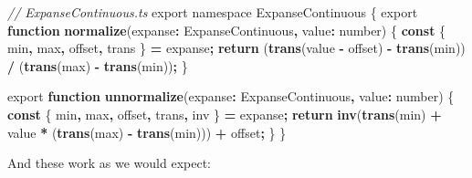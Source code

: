 \documentclass[
]{book}
\newenvironment{Shaded}{\begin{snugshade}}{\end{snugshade}}
\newcommand{\CommentTok}[1]{\textcolor[rgb]{0.56,0.35,0.01}{\textit{#1}}}
\newcommand{\ControlFlowTok}[1]{\textcolor[rgb]{0.13,0.29,0.53}{\textbf{#1}}}
\newcommand{\DataTypeTok}[1]{\textcolor[rgb]{0.13,0.29,0.53}{#1}}
\newcommand{\FunctionTok}[1]{\textcolor[rgb]{0.13,0.29,0.53}{\textbf{#1}}}
\newcommand{\ImportTok}[1]{#1}
\newcommand{\KeywordTok}[1]{\textcolor[rgb]{0.13,0.29,0.53}{\textbf{#1}}}
\newcommand{\NormalTok}[1]{#1}
\newcommand{\OperatorTok}[1]{\textcolor[rgb]{0.81,0.36,0.00}{\textbf{#1}}}
\theoremstyle{definition}
\theoremstyle{definition}
\theoremstyle{definition}
\theoremstyle{definition}
\theoremstyle{remark}
\begin{document}
\begin{Shaded}
\begin{Highlighting}[]
\CommentTok{// ExpanseContinuous.ts}
\ImportTok{export} \ImportTok{namespace} \DataTypeTok{ExpanseContinuous}\NormalTok{ \{}
    \ImportTok{export} \KeywordTok{function} \FunctionTok{normalize}\NormalTok{(expanse}\OperatorTok{:}\NormalTok{ ExpanseContinuous}\OperatorTok{,}\NormalTok{ value}\OperatorTok{:} \DataTypeTok{number}\NormalTok{) \{}
    \KeywordTok{const}\NormalTok{ \{ min}\OperatorTok{,}\NormalTok{ max}\OperatorTok{,}\NormalTok{ offset}\OperatorTok{,}\NormalTok{ trans \} }\OperatorTok{=}\NormalTok{ expanse}\OperatorTok{;}
    \ControlFlowTok{return}\NormalTok{ (}\FunctionTok{trans}\NormalTok{(value }\OperatorTok{{-}}\NormalTok{ offset) }\OperatorTok{{-}} \FunctionTok{trans}\NormalTok{(min)) }\OperatorTok{/}\NormalTok{ (}\FunctionTok{trans}\NormalTok{(max) }\OperatorTok{{-}} \FunctionTok{trans}\NormalTok{(min))}\OperatorTok{;}
\NormalTok{  \}}

  \ImportTok{export} \KeywordTok{function} \FunctionTok{unnormalize}\NormalTok{(expanse}\OperatorTok{:}\NormalTok{ ExpanseContinuous}\OperatorTok{,}\NormalTok{ value}\OperatorTok{:} \DataTypeTok{number}\NormalTok{) \{}
    \KeywordTok{const}\NormalTok{ \{ min}\OperatorTok{,}\NormalTok{ max}\OperatorTok{,}\NormalTok{ offset}\OperatorTok{,}\NormalTok{ trans}\OperatorTok{,}\NormalTok{ inv \} }\OperatorTok{=}\NormalTok{ expanse}\OperatorTok{;}
    \ControlFlowTok{return} \FunctionTok{inv}\NormalTok{(}\FunctionTok{trans}\NormalTok{(min) }\OperatorTok{+}\NormalTok{ value }\OperatorTok{*}\NormalTok{ (}\FunctionTok{trans}\NormalTok{(max) }\OperatorTok{{-}} \FunctionTok{trans}\NormalTok{(min))) }\OperatorTok{+}\NormalTok{ offset}\OperatorTok{;}
\NormalTok{  \}}
\NormalTok{\}}
\end{Highlighting}
\end{Shaded}

And these work as we would expect:
\end{document}
